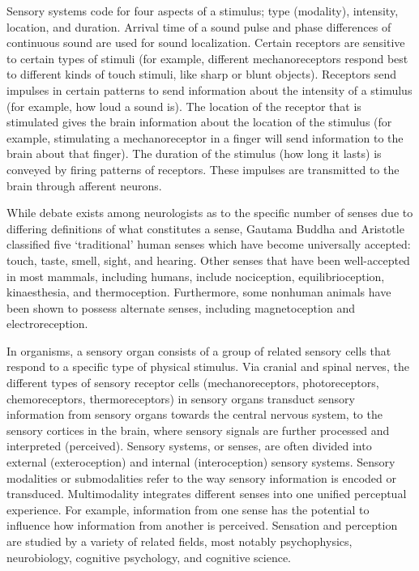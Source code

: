 Sensory systems code for four aspects of a stimulus; type (modality),
intensity, location, and duration. Arrival time of a sound pulse and
phase differences of continuous sound are used for sound localization.
Certain receptors are sensitive to certain types of stimuli (for
example, different mechanoreceptors respond best to different kinds of
touch stimuli, like sharp or blunt objects). Receptors send impulses in
certain patterns to send information about the intensity of a stimulus
(for example, how loud a sound is). The location of the receptor that is
stimulated gives the brain information about the location of the
stimulus (for example, stimulating a mechanoreceptor in a finger will
send information to the brain about that finger). The duration of the
stimulus (how long it lasts) is conveyed by firing patterns of
receptors. These impulses are transmitted to the brain through afferent
neurons.

While debate exists among neurologists as to the specific number of
senses due to differing definitions of what constitutes a sense, Gautama
Buddha and Aristotle classified five `traditional' human senses which
have become universally accepted: touch, taste, smell, sight, and
hearing. Other senses that have been well-accepted in most mammals,
including humans, include nociception, equilibrioception, kinaesthesia,
and thermoception. Furthermore, some nonhuman animals have been shown to
possess alternate senses, including magnetoception and electroreception.

In organisms, a sensory organ consists of a group of related sensory
cells that respond to a specific type of physical stimulus. Via cranial
and spinal nerves, the different types of sensory receptor cells
(mechanoreceptors, photoreceptors, chemoreceptors, thermoreceptors) in
sensory organs transduct sensory information from sensory organs towards
the central nervous system, to the sensory cortices in the brain, where
sensory signals are further processed and interpreted (perceived).
Sensory systems, or senses, are often divided into external
(exteroception) and internal (interoception) sensory systems. Sensory
modalities or submodalities refer to the way sensory information is
encoded or transduced. Multimodality integrates different senses into
one unified perceptual experience. For example, information from one
sense has the potential to influence how information from another is
perceived. Sensation and perception are studied by a variety of related
fields, most notably psychophysics, neurobiology, cognitive psychology,
and cognitive science.

